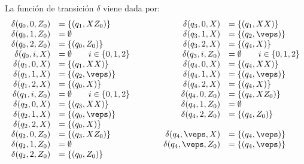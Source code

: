 \begin{ejercicio}
    La función de transición $\delta$ viene dada por:
    \begin{equation*}
        \begin{array}{rlcrl}
            \delta(q_0,0,Z_0) &= \{(q_1,XZ_0)\}
            &\qquad& \delta(q_3,0,X) &= \{(q_1,XX)\} \\
            \delta(q_0,1,Z_0) &= \emptyset
            &\qquad& \delta(q_3,1,X) &= \{(q_2,\veps)\} \\
            \delta(q_0,2,Z_0) &= \{(q_0,Z_0)\}
            &\qquad& \delta(q_3,2,X) &= \{(q_4,X)\} \\
            \delta(q_0,i,X) &= \emptyset \qquad i\in\{0,1,2\} & \qquad & \delta(q_3,i,Z_0) &= \emptyset \qquad i\in\{0,1,2\} \\
            \delta(q_1,0,X) &= \{(q_1,XX)\}
            &\qquad& \delta(q_4,0,X) &= \{(q_4,XX)\} \\
            \delta(q_1,1,X) &= \{(q_2,\veps)\}
            &\qquad& \delta(q_4,1,X) &= \{(q_4,\veps)\} \\
            \delta(q_1,2,X) &= \{(q_0,X)\}
            &\qquad& \delta(q_4,2,X) &= \{(q_4,X)\} \\
            \delta(q_1,i,Z_0) &= \emptyset \qquad i\in\{0,1,2\} & \qquad & \delta(q_4,0,Z_0) &= \{(q_4,XZ_0)\} \\
            \delta(q_2,0,X) &= \{(q_3,XX)\} 
            &\qquad& \delta(q_4,1,Z_0) &= \emptyset \\
            \delta(q_2,1,X) &= \{(q_0,\veps)\}
            &\qquad& \delta(q_4,2,Z_0) &= \{(q_4,Z_0)\} \\
            \delta(q_2,2,X) &= \{(q_0,X)\}
            &\qquad& \\
            \delta(q_2,0,Z_0) &= \{(q_3,XZ_0)\}
            &\qquad&  \delta(q_4,\veps,X) &= \{(q_4,\veps)\}\\
            \delta(q_2,1,Z_0) &= \emptyset
            &\qquad& \delta(q_4,\veps,Z_0) &= \{(q_4,\veps)\}\\
            \delta(q_2,2,Z_0) &= \{(q_0,Z_0)\}
        \end{array}
    \end{equation*}
    \begin{comment}
    \begin{align*}
        &\delta(q_0,0,Z_0) = \{(q_1,XZ_0)\} \\
        &\delta(q_0,1,Z_0) = \emptyset \\
        &\delta(q_0,2,Z_0) = \{(q_0,Z_0)\} \\
        &\delta(q_0,i,X) = \emptyset \qquad i\in\{0,1,2\}\\

\end{comment}
\end{ejercicio}
